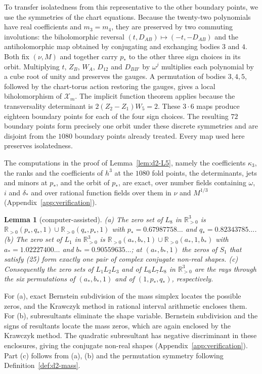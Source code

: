 \documentclass[Threeside,11pt]{article}
\newtheorem{lemma}[theorem]{Lemma}
\theoremstyle{definition}
\theoremstyle{remark}
\numberwithin{equation}{section}
\theoremstyle{remark}
\newcommand{\Rp}{\mathbb{R}_{>0}}
\begin{document}
{To transfer isolatedness from this representative to the other boundary points,
we use the symmetries of the chart equations.
Because the twenty-two polynomials have real coefficients and $m_3=m_4$, they are
preserved by two commuting involutions: the biholomorphic reversal
$(t,D_{AB})\mapsto(-t,-D_{AB})$ and the antiholomorphic map obtained by conjugating and
exchanging bodies $3$ and $4$.
Both fix $(\nu,M)$ and together carry $p_*$ to the other three sign choices in its orbit.
Multiplying $t$, $Z_B$, $W_A$, $D_{12}$ and $D_{BB'}$ by $\omega^j$ multiplies each
polynomial by a cube root of unity and preserves the gauges.
A permutation of bodies $3,4,5$, followed by the chart-torus action restoring the
gauges, gives a local biholomorphism of $\mathcal X_m$.
The implicit function theorem applies because the transversality determinant is
$2(Z_2-Z_1)W_5=2$.
These $3\cdot6$ maps produce eighteen boundary points for each of the four sign choices.
The resulting $72$ boundary points form precisely one orbit under these discrete symmetries and
are disjoint from the $1080$ boundary points already treated.
Every map used here preserves isolatedness.}

The computations in the proof of Lemma~\ref{lem:d2-L5}, namely the coefficients $\kappa_3$, the
ranks and the coefficients of $h^3$ at the $1080$ fold points, the determinants, jets and minors
at $p_*$, and the orbit of $p_*$, are exact, over number fields containing $\omega$, $i$ and
$\delta_*$ and over rational function fields over them in $\nu$ and $M^{1/3}$
(Appendix~\ref{app:verification}).

\begin{lemma}[computer-assisted]\label{lem:d2-rays}
\textup{(a)} The zero set of $L_8$ in $\Rp^3$ is $\Rp(p_*,q_*,1)\cup\Rp(q_*,p_*,1)$ with
$p_*=0.67987758\ldots$ and $q_*=0.82343785\ldots$.
\textup{(b)} The zero set of $L_1$ in $\Rp^3$ is $\Rp(a_*,b_*,1)\cup\Rp(a_*,1,b_*)$ with
$a_*=1.02227400\ldots$ and $b_*=0.90559635\ldots$; at $(a_*,b_*,1)$ the zeros of $S_1$ that
satisfy \textup{(25)} form exactly one pair of complex conjugate non-real shapes.
\textup{(c)} Consequently the zero sets of $L_1L_2L_3$ and of $L_6L_7L_8$ in $\Rp^3$ are the rays
through the six permutations of $(a_*,b_*,1)$ and of $(1,p_*,q_*)$, respectively.
\end{lemma}
{For (a), exact Bernstein subdivision of the mass simplex locates the
possible zeros, and the Krawczyk method in rational interval arithmetic encloses them.
For (b), subresultants eliminate the shape variable.
Bernstein subdivision and the signs of resultants locate the mass zeros, which are
again enclosed by the Krawczyk method.  The quadratic subresultant has negative
discriminant in these enclosures, giving the conjugate non-real shapes
(Appendix~\ref{app:verification}).
Part (c) follows from (a), (b) and the permutation symmetry following
Definition~\ref{def:d2-mass}.}
\end{document}
